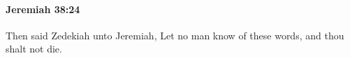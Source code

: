 
		\paragraph{Jeremiah 38:24} %
			\label{JEREMIAH-38-24}

			Then said Zedekiah unto Jeremiah, Let no man know of these words, and thou shalt not die.


